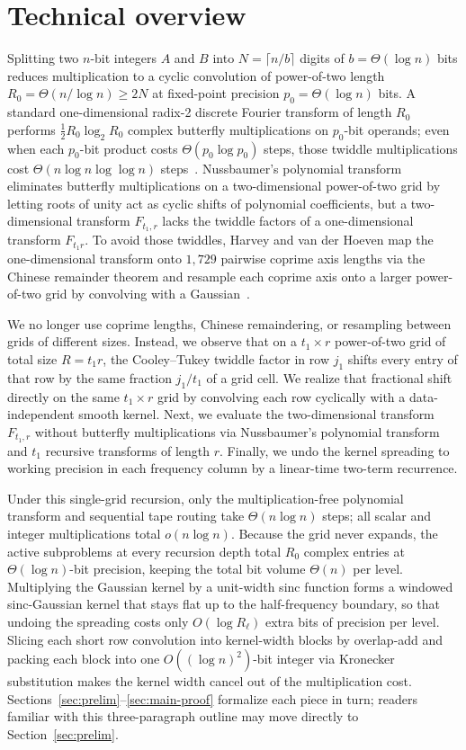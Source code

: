 \section{Technical overview}\label{sec:overview}

Splitting two $n$-bit integers $A$ and $B$ into $N = \lceil n / b \rceil$ digits of $b = \Theta(\log n)$ bits reduces multiplication to a cyclic convolution of power-of-two length $R_0 = \Theta(n / \log n) \ge 2N$ at fixed-point precision $p_0 = \Theta(\log n)$ bits. A standard one-dimensional radix-2 discrete Fourier transform of length $R_0$ performs $\frac{1}{2} R_0 \log_2 R_0$ complex butterfly multiplications on $p_0$-bit operands; even when each $p_0$-bit product costs $\Theta(p_0 \log p_0)$ steps, those twiddle multiplications cost $\Theta(n \log n \log \log n)$ steps~\cite{HvdH21}. Nussbaumer's polynomial transform~\cite{Nussbaumer80} eliminates butterfly multiplications on a two-dimensional power-of-two grid by letting roots of unity act as cyclic shifts of polynomial coefficients, but a two-dimensional transform $F_{t_1, r}$ lacks the twiddle factors of a one-dimensional transform $F_{t_1 r}$. To avoid those twiddles, Harvey and van der Hoeven map the one-dimensional transform onto $1{,}729$ pairwise coprime axis lengths via the Chinese remainder theorem and resample each coprime axis onto a larger power-of-two grid by convolving with a Gaussian~\cite{HvdH21}.

We no longer use coprime lengths, Chinese remaindering, or resampling between grids of different sizes. Instead, we observe that on a $t_1 \times r$ power-of-two grid of total size $R = t_1 r$, the Cooley--Tukey twiddle factor in row $j_1$ shifts every entry of that row by the same fraction $j_1 / t_1$ of a grid cell. We realize that fractional shift directly on the same $t_1 \times r$ grid by convolving each row cyclically with a data-independent smooth kernel. Next, we evaluate the two-dimensional transform $F_{t_1, r}$ without butterfly multiplications via Nussbaumer's polynomial transform and $t_1$ recursive transforms of length $r$. Finally, we undo the kernel spreading to working precision in each frequency column by a linear-time two-term recurrence.

Under this single-grid recursion, only the multiplication-free polynomial transform and sequential tape routing take $\Theta(n \log n)$ steps; all scalar and integer multiplications total $o(n \log n)$. Because the grid never expands, the active subproblems at every recursion depth total $R_0$ complex entries at $\Theta(\log n)$-bit precision, keeping the total bit volume $\Theta(n)$ per level. Multiplying the Gaussian kernel by a unit-width sinc function forms a windowed sinc-Gaussian kernel that stays flat up to the half-frequency boundary, so that undoing the spreading costs only $O(\log R_\ell)$ extra bits of precision per level. Slicing each short row convolution into kernel-width blocks by overlap-add and packing each block into one $O((\log n)^2)$-bit integer via Kronecker substitution makes the kernel width cancel out of the multiplication cost. Sections~\ref{sec:prelim}--\ref{sec:main-proof} formalize each piece in turn; readers familiar with this three-paragraph outline may move directly to Section~\ref{sec:prelim}.

